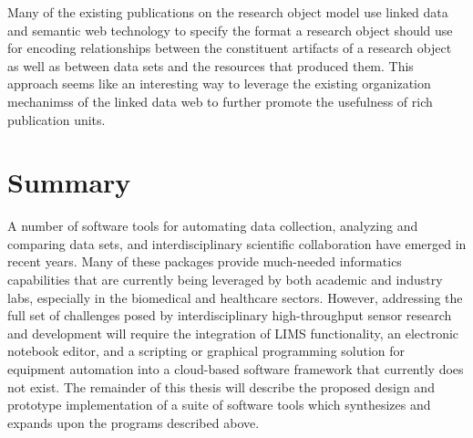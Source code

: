 \documentclass[../thesis]{subfiles}
\begin{document}
Many of the existing publications on the research object model
\cite{corcho2012workflow, belhajjame2015using} use
linked data and semantic web technology to specify the format a
research object should use for encoding relationships
between the constituent artifacts of a research object as well as
between data sets and the resources that produced them. This approach
seems like an interesting way to leverage the existing organization
mechanimss of the linked data web to further promote the usefulness of
rich publication units.



\section{Summary}
A number of software tools for automating data collection, analyzing
and comparing data sets, and interdisciplinary scientific
collaboration have emerged in recent years. Many of these packages
provide much-needed informatics capabilities that are currently being
leveraged by both academic and industry labs, especially in the
biomedical and healthcare sectors. However, addressing the full set of
challenges posed by interdisciplinary high-throughput sensor research
and development will require the integration of \gls{LIMS}
functionality, an electronic notebook editor, and a scripting or
graphical programming solution for equipment automation into a
cloud-based software framework that currently does not exist. The
remainder of this thesis will describe the proposed design and
prototype implementation of a suite of software tools which
synthesizes and expands upon the programs described above.
\end{document}
